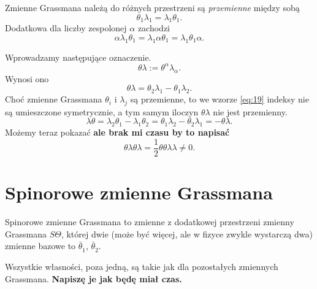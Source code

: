 \documentclass[a4paper,11pt]{article}
\begin{document}
Zmienne Grassmana należą do różnych przestrzeni są \textit{przemienne} między sobą
\begin{equation}
  \label{eq:15}
  \theta_{ 1 } \lambda_{ 1 } = \lambda_{ 1 } \theta_{ 1 }.
\end{equation}
Dodatkowa dla liczby zespolonej $\alpha$ zachodzi
\begin{equation}
  \label{eq:16}
  \alpha \lambda_{ 1 } \theta_{ 1 } = \lambda_{ 1 } \alpha \theta_{ 1 } = \lambda_{ 1 } \theta_{ 1 } \alpha.
\end{equation}

Wprowadzamy następujące oznaczenie.
\begin{equation}
  \label{eq:19}
  \theta \lambda := \theta^{ \alpha } \lambda_{ \alpha }.
\end{equation}
Wynosi ono
\begin{equation}
  \label{eq:20}
  \theta \lambda = \theta_{ 2 } \lambda_{ 1 } - \theta_{ 1 } \lambda_{ 2 }.
\end{equation}
Choć zmienne Grassmana $\theta_{ i }$ i $\lambda_{ j }$ są przemienne, to we wzorze \eqref{eq:19} indeksy nie są umieszczone symetrycznie, a tym samym iloczyn $ \theta \lambda$ nie jest przemienny.
\begin{equation}
  \label{eq:21}
  \lambda \theta = \lambda_{ 2 } \theta_{ 1 } - \lambda_{ 1 } \theta_{ 2 }
  = \theta_{ 1 } \lambda_{ 2 } - \theta_{ 2 } \lambda_{ 1 }
  = -\theta \lambda.
\end{equation}
Możemy teraz pokazać \textbf{ale brak mi czasu by to napisać}
\begin{equation}
  \label{eq:22}
  \theta \lambda \theta \lambda = \frac{ 1 }{ 2 } \theta \theta \lambda \lambda \neq 0.
\end{equation}







\section{Spinorowe zmienne Grassmana}


Spinorowe zmienne Grassmana to zmienne z dodatkowej przestrzeni zmienny Grassmana $S \Theta$, której dwie (może być więcej, ale w fizyce zwykle wystarczą dwa) zmienne bazowe to $\bar{\theta}_{ \dot{ 1 } }$, $\bar{\theta}_{ \dot{ 2 } }$.

Wszystkie własności, poza jedną, są takie jak dla pozostałych zmiennych Grassmana. \textbf{Napiszę je jak będę miał czas.}
\end{document}
